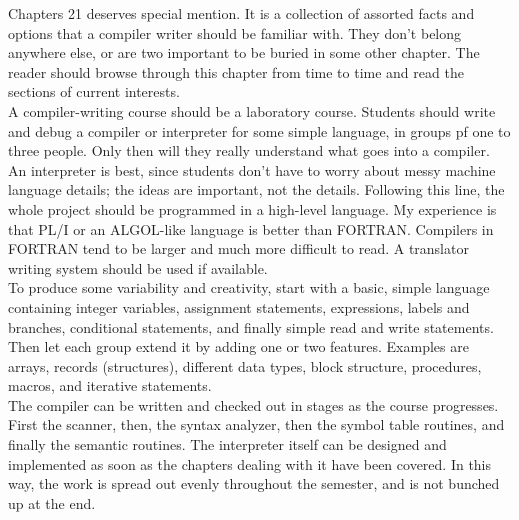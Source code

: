 \documentclass[../main.tex]{subfiles}
\begin{document}
Chapters 21 deserves special mention. It is a collection of assorted facts and options that a compiler writer should be familiar with. They don't belong anywhere else, or are two important to be buried in some other chapter. The reader should browse through this chapter from time to time and read the sections of current interests.\\

A compiler-writing course should be a laboratory course. Students should write and debug a compiler or interpreter for some simple language, in groups pf one to three people. Only then will they really understand what goes into a compiler. An interpreter is best, since students don't have to worry about messy machine language details; the ideas are important, not the details. Following this line, the whole project should be programmed in a high-level language. My experience is that PL/I or an ALGOL-like language is better than FORTRAN. Compilers in FORTRAN tend to be larger and much more difficult to read. A translator  writing system should be used if available.\\

To produce some variability and creativity, start with a basic, simple language containing integer variables, assignment statements, expressions, labels and branches, conditional statements, and finally simple read and write statements. Then let each group extend it by adding one or two features. Examples are arrays, records (structures), different data types, block structure, procedures, macros, and iterative statements.\\

The compiler can be written and checked out in stages as the course progresses. First the scanner, then, the syntax analyzer, then the symbol table routines, and finally the semantic routines. The interpreter itself can be designed
and implemented as soon as the chapters dealing with it have been covered. In this way, the work is spread out evenly throughout the semester, and is not bunched up at the end.
\end{document}
